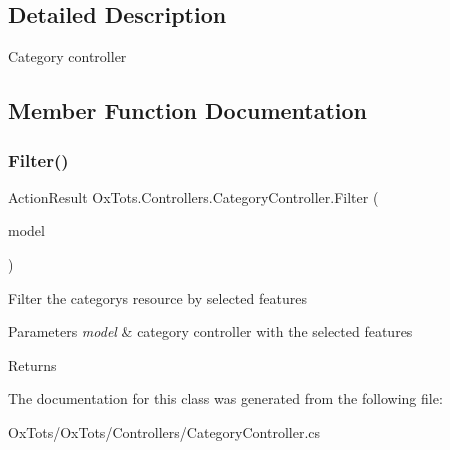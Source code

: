 \subsection{Detailed Description}
Category controller 



\subsection{Member Function Documentation}
\mbox{\label{class_ox_tots_1_1_controllers_1_1_category_controller_a391a2d3aed302502894c560096e54358}} 
\subsubsection{\texorpdfstring{Filter()}{Filter()}}
{\footnotesize\ttfamily Action\+Result Ox\+Tots.\+Controllers.\+Category\+Controller.\+Filter (\begin{DoxyParamCaption}\item[{Category\+View\+Model}]{model }\end{DoxyParamCaption})\hspace{0.3cm}{\ttfamily [inline]}}



Filter the category\textquotesingle{}s resource by selected features 


\begin{DoxyParams}{Parameters}
{\em model} & category controller with the selected features\\
\hline
\end{DoxyParams}
\begin{DoxyReturn}{Returns}

\end{DoxyReturn}


The documentation for this class was generated from the following file\+:\begin{DoxyCompactItemize}
\item 
Ox\+Tots/\+Ox\+Tots/\+Controllers/Category\+Controller.\+cs\end{DoxyCompactItemize}
